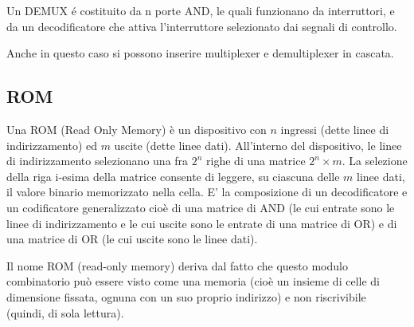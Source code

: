 Un DEMUX é costituito da n porte AND, le quali funzionano da interruttori, e da un decodificatore che attiva l’interruttore selezionato dai segnali di controllo.

Anche in questo caso si possono inserire multiplexer e demultiplexer in cascata.

\subsection{ROM}

Una ROM (Read Only Memory) è un dispositivo con $n$ ingressi (dette linee di indirizzamento) ed $m$ uscite (dette linee dati). 
All'interno del dispositivo, le linee di indirizzamento selezionano una fra $2^n$ righe di una matrice $2^n×m$.
La selezione della riga i-esima della matrice consente di leggere, su ciascuna delle $m$ linee dati, il valore binario memorizzato nella cella.
E’ la composizione di un decodificatore e un codificatore generalizzato cioè di una matrice di AND (le cui entrate sono le linee di indirizzamento e le cui uscite sono le entrate di una matrice di OR) e di una matrice di OR (le cui uscite sono le linee dati).

Il nome ROM (read-only memory) deriva dal fatto che questo modulo combinatorio può essere visto come una memoria (cioè un insieme di celle di dimensione fissata, ognuna con un suo proprio indirizzo) e non riscrivibile (quindi, di sola lettura).

